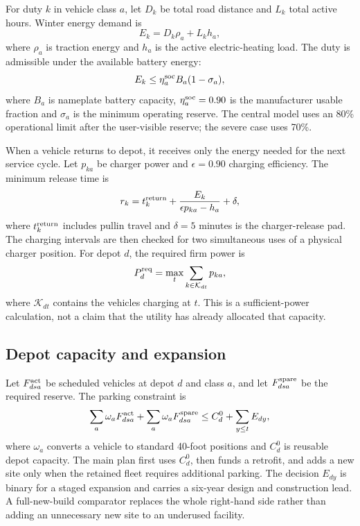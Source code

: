 \documentclass[12pt,letterpaper]{article}
\begin{document}
For duty $k$ in vehicle class $a$, let $D_k$ be total road distance and $L_k$ total active hours. Winter energy demand is
\begin{equation}
E_k=D_k\rho_a+L_k h_a,
\end{equation}
where $\rho_a$ is traction energy and $h_a$ is the active electric-heating load. The duty is admissible under the available battery energy:
\begin{equation}
E_k\le \eta^{\rm soc}_a B_a(1-\sigma_a),
\end{equation}
where $B_a$ is nameplate battery capacity, $\eta^{\rm soc}_a=0.90$ is the manufacturer usable fraction and $\sigma_a$ is the minimum operating reserve. The central model uses an 80\% operational limit after the user-visible reserve; the severe case uses 70\%.

When a vehicle returns to depot, it receives only the energy needed for the next service cycle. Let $p_{ka}$ be charger power and $\epsilon=0.90$ charging efficiency. The minimum release time is
\begin{equation}
r_k=t_k^{\rm return}+\frac{E_k}{\epsilon p_{ka}-h_a}+\delta,
\end{equation}
where $t_k^{\rm return}$ includes pullin travel and $\delta=5$ minutes is the charger-release pad. The charging intervals are then checked for two simultaneous uses of a physical charger position. For depot $d$, the required firm power is
\begin{equation}
P_d^{\rm req}=\max_t\sum_{k\in\mathcal K_{dt}}p_{ka},
\end{equation}
where $\mathcal K_{dt}$ contains the vehicles charging at $t$. This is a sufficient-power calculation, not a claim that the utility has already allocated that capacity.

\subsection{Depot capacity and expansion}

Let $F^{\rm act}_{dsa}$ be scheduled vehicles at depot $d$ and class $a$, and let $F^{\rm spare}_{dsa}$ be the required reserve. The parking constraint is
\begin{equation}
\sum_a \omega_a F^{\rm act}_{dsa}+\sum_a \omega_a F^{\rm spare}_{dsa}
\le C_d^0+\sum_{y\le t}E_{dy},
\end{equation}
where $\omega_a$ converts a vehicle to standard 40-foot positions and $C_d^0$ is reusable depot capacity. The main plan first uses $C_d^0$, then funds a retrofit, and adds a new site only when the retained fleet requires additional parking. The decision $E_{dy}$ is binary for a staged expansion and carries a six-year design and construction lead. A full-new-build comparator replaces the whole right-hand side rather than adding an unnecessary new site to an underused facility.
\end{document}
